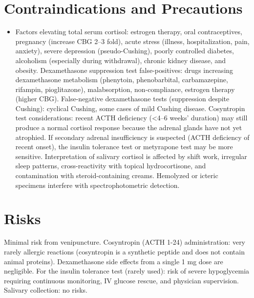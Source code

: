 \section*{Contraindications and Precautions}
\begin{itemize}
  \item Factors elevating total serum cortisol: estrogen therapy, oral contraceptives, pregnancy (increase CBG 2--3 fold), acute stress (illness, hospitalization, pain, anxiety), severe depression (pseudo-Cushing), poorly controlled diabetes, alcoholism (especially during withdrawal), chronic kidney disease, and obesity. Dexamethasone suppression test false-positives: drugs increasing dexamethasone metabolism (phenytoin, phenobarbital, carbamazepine, rifampin, pioglitazone), malabsorption, non-compliance, estrogen therapy (higher CBG). False-negative dexamethasone tests (suppression despite Cushing): cyclical Cushing, some cases of mild Cushing disease. Cosyntropin test considerations: recent ACTH deficiency (<4--6 weeks' duration) may still produce a normal cortisol response because the adrenal glands have not yet atrophied. If secondary adrenal insufficiency is suspected (ACTH deficiency of recent onset), the insulin tolerance test or metyrapone test may be more sensitive. Interpretation of salivary cortisol is affected by shift work, irregular sleep patterns, cross-reactivity with topical hydrocortisone, and contamination with steroid-containing creams. Hemolyzed or icteric specimens interfere with spectrophotometric detection.
\end{itemize}
\section*{Risks}
Minimal risk from venipuncture. Cosyntropin (ACTH 1-24) administration: very rarely allergic reactions (cosyntropin is a synthetic peptide and does not contain animal proteins). Dexamethasone side effects from a single 1 mg dose are negligible. For the insulin tolerance test (rarely used): risk of severe hypoglycemia requiring continuous monitoring, IV glucose rescue, and physician supervision. Salivary collection: no risks.

